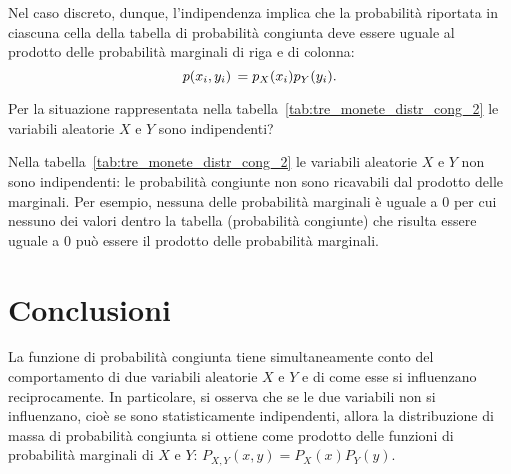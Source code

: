 Nel caso discreto, dunque, l'indipendenza implica che la probabilità riportata in ciascuna cella della tabella di probabilità congiunta deve essere uguale al prodotto delle probabilità marginali di riga e di colonna:
\begin{equation}
p(x_i, y_i)\, = p_X(x_i) p_Y(y_i).\notag
\end{equation}


\begin{exmp}
\label{ex:three_coins_non_ind}
Per la situazione rappresentata nella tabella~\ref{tab:tre_monete_distr_cong_2} le variabili aleatorie $X$ e $Y$ sono indipendenti?
\end{exmp}
\begin{solu}
Nella tabella~\ref{tab:tre_monete_distr_cong_2} le variabili aleatorie $X$ e $Y$ non sono indipendenti: le probabilità congiunte non sono ricavabili dal prodotto delle marginali. 
Per esempio, nessuna delle probabilità marginali è uguale a $0$ per cui nessuno dei valori dentro la tabella (probabilità congiunte) che risulta essere uguale a $0$ può essere il prodotto delle probabilità marginali.
\end{solu}


\section*{Conclusioni}

La funzione di probabilità congiunta tiene simultaneamente conto del comportamento di due variabili aleatorie $X$ e $Y$ e di come esse si influenzano reciprocamente. 
In particolare, si osserva che se le due variabili non si influenzano, cioè se sono statisticamente indipendenti, allora la distribuzione di massa di probabilità congiunta si ottiene come prodotto delle funzioni di probabilità marginali di $X$ e $Y$: $P_{X, Y}(x, y) = P_X(x) P_Y(y)$.


